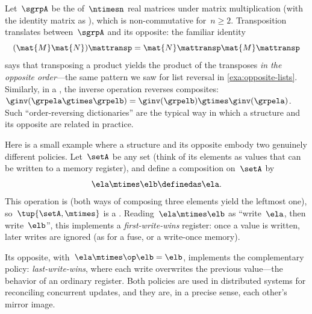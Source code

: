\begin{example}
    \label{exa:opposite-matrices}
    Let~$\sgrpA$ be the  of~$\ntimesn$ real matrices under matrix multiplication (with the identity matrix as ), which is non-commutative for~$n \geq 2$.
    Transposition translates between~$\sgrpA$ and its opposite: the familiar identity
    \begin{equation}
        (\mat{M} \mat{N})\mattransp = \mat{N}\mattransp \mat{M}\mattransp
    \end{equation}
    says that transposing a product yields the product of the transposes \emph{in the opposite order}---the same pattern we saw for list reversal in \cref{exa:opposite-lists}.
    Similarly, in a , the inverse operation reverses composites: $\ginv(\grpela \gtimes \grpelb) = \ginv(\grpelb) \gtimes \ginv(\grpela)$.
    Such ``order-reversing dictionaries'' are the typical way in which a structure and its opposite are related in practice.
\end{example}

\begin{example}
    \label{exa:opposite-first-write}
    Here is a small example where a structure and its opposite embody two genuinely different policies.
    Let~$\setA$ be any set (think of its elements as values that can be written to a memory register), and define a composition on~$\setA$ by
    \begin{equation}
        \ela \mtimes \elb \definedas \ela .
    \end{equation}
    This operation is  (both ways of composing three elements yield the leftmost one), so~$\tup{\setA, \mtimes}$ is a .
    Reading~$\ela \mtimes \elb$ as ``write~$\ela$, then write~$\elb$'', this  implements a \emph{first-write-wins} register: once a value is written, later writes are ignored (as for a fuse, or a write-once memory).

    Its opposite, with~$\ela \mtimes\op \elb = \elb$, implements the complementary policy: \emph{last-write-wins}, where each write overwrites the previous value---the behavior of an ordinary register.
    Both policies are used in distributed systems for reconciling concurrent updates, and they are, in a precise sense, each other's mirror image.
\end{example}

